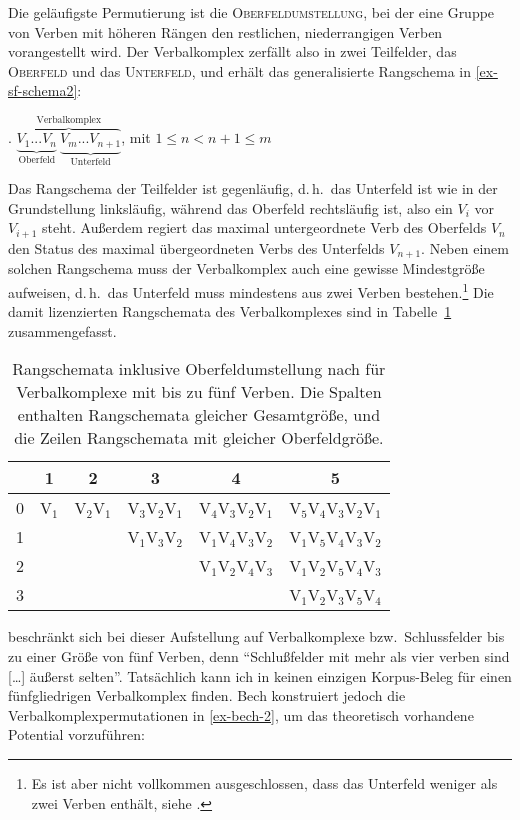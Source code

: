 Die geläufigste Permutierung ist die \textsc{Oberfeldumstellung}, bei der eine Gruppe von Verben mit höheren Rängen den restlichen, niederrangigen Verben vorangestellt wird. Der Verbalkomplex zerfällt also in zwei Teilfelder, das \textsc{Oberfeld} und das \textsc{Unterfeld}, und erhält das generalisierte Rangschema in \ref{ex-sf-schema2}: 

\ex.   $\overbrace{\underbrace{V_1 ... V_{n}}_{\text{Oberfeld}} \ \underbrace{V_{m} ... V_{n+1}}_{\text{Unterfeld}}}^{\text{Verbalkomplex}}$, mit $1 \leq n < n+1 \leq m$ \label{ex-sf-schema2}

Das Rangschema der Teilfelder ist gegenläufig, d.\,h.\ das Unterfeld ist wie in der Grundstellung linksläufig, während das Oberfeld rechtsläufig ist, also ein $V_i$ vor $V_{i+1}$ steht. Au\ss erdem regiert das maximal untergeordnete Verb des Oberfelds $V_n$ den Status des maximal übergeordneten Verbs des Unterfelds $V_{n+1}$. Neben einem solchen Rangschema muss der Verbalkomplex auch eine gewisse Mindestgrö\ss e aufweisen, d.\,h.\ das Unterfeld muss mindestens aus zwei Verben bestehen.\footnote{Es ist aber nicht vollkommen ausgeschlossen, dass das Unterfeld weniger als zwei Verben enthält, siehe \citet[83]{Meurers:99}.} Die damit lizenzierten Rangschemata des Verbalkomplexes sind in Tabelle~\ref{fig-oberfeld} zusammengefasst.
\begin{table}[t]
\begin{center}

\begin{tabular}{c||c|c|c|c|c}
& 1	& 2	& 3	& 4	& 5	\\
\hline\hline
0	& V$_1$	& V$_2$V$_1$ & V$_3$V$_2$V$_1$ & V$_4$V$_3$V$_2$V$_1$ & V$_5$V$_4$V$_3$V$_2$V$_1$ \\
\hline
1	& 	& 	     & V$_1$V$_3$V$_2$ & V$_1$V$_4$V$_3$V$_2$ & V$_1$V$_5$V$_4$V$_3$V$_2$ \\
\hline
2	&	&	     &		       & V$_1$V$_2$V$_4$V$_3$ & V$_1$V$_2$V$_5$V$_4$V$_3$ \\
\hline
3	& 	& 	     & 		       & 		      & V$_1$V$_2$V$_3$V$_5$V$_4$ \\
\end{tabular} 

\end{center}
\caption{Rangschemata inklusive Oberfeldumstellung nach \citet[\S 61]{Bech:55} für Verbalkomplexe mit bis zu fünf Verben. Die Spalten enthalten Rangschemata gleicher Gesamtgrö\ss e, und die Zeilen Rangschemata mit gleicher Oberfeldgrö\ss e.\label{fig-oberfeld}}
\end{table}
\citet[\S 61]{Bech:55} beschränkt sich bei dieser Aufstellung auf Verbalkomplexe bzw.\ Schlussfelder bis zu einer Grö\ss e von fünf Verben, denn "`Schlu\ss felder mit mehr als vier verben sind [\ldots] äu\ss erst selten"'. Tatsächlich kann ich in \cite{Bech:55} keinen einzigen Korpus-Beleg für einen fünfgliedrigen Verbalkomplex finden. Bech konstruiert jedoch die Verbalkomplexpermutationen in \ref{ex-bech-2}, um das theoretisch vorhandene Potential vorzuführen:

